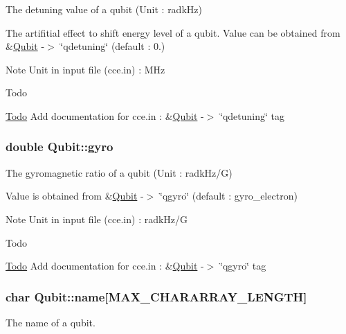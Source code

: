 The detuning value of a qubit (Unit \-: radk\-Hz) 

The artifitial effect to shift energy level of a qubit. Value can be obtained from \&\hyperlink{structQubit}{Qubit} -\/$>$ \char`\"{}qdetuning\char`\"{} (default \-: 0.) \begin{DoxyNote}{Note}
Unit in input file (cce.\-in) \-: M\-Hz 
\end{DoxyNote}
\begin{DoxyRefDesc}{Todo}
\item[\hyperlink{todo__todo000019}{Todo}]Add documentation for cce.\-in \-: \&\hyperlink{structQubit}{Qubit} -\/$>$ \char`\"{}qdetuning\char`\"{} tag \end{DoxyRefDesc}
\hypertarget{structQubit_a668a62d3ddf72e6b9acbc6338c97090f}{
\subsubsection[{gyro}]{\setlength{\rightskip}{0pt plus 5cm}double Qubit\-::gyro}}\label{structQubit_a668a62d3ddf72e6b9acbc6338c97090f}


The gyromagnetic ratio of a qubit (Unit \-: radk\-Hz/\-G) 

Value is obtained from \&\hyperlink{structQubit}{Qubit} -\/$>$ \char`\"{}qgyro\char`\"{} (default \-: gyro\-\_\-electron) \begin{DoxyNote}{Note}
Unit in input file (cce.\-in) \-: radk\-Hz/\-G 
\end{DoxyNote}
\begin{DoxyRefDesc}{Todo}
\item[\hyperlink{todo__todo000017}{Todo}]Add documentation for cce.\-in \-: \&\hyperlink{structQubit}{Qubit} -\/$>$ \char`\"{}qgyro\char`\"{} tag \end{DoxyRefDesc}
\hypertarget{structQubit_ab65a0dfa0efbd8a7862403f4704c1587}{
\subsubsection[{name}]{\setlength{\rightskip}{0pt plus 5cm}char Qubit\-::name\mbox{[}M\-A\-X\-\_\-\-C\-H\-A\-R\-A\-R\-R\-A\-Y\-\_\-\-L\-E\-N\-G\-T\-H\mbox{]}}}\label{structQubit_ab65a0dfa0efbd8a7862403f4704c1587}


The name of a qubit. 

